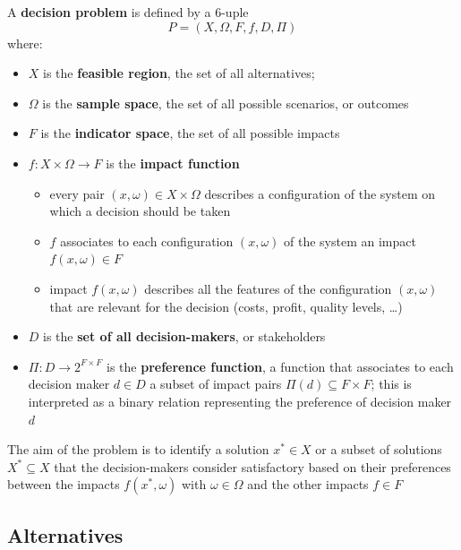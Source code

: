 \begin{definition}
	A \textbf{decision problem} is defined by a 6-uple
	$$ P = \left(X, \Omega, F, f, D, \Pi \right)$$
	where: 
	\begin{itemize}
		\item $X$ is the \textbf{feasible region}, the set of all alternatives; 
		
		\item $\Omega$ is the \textbf{sample space}, the set of all possible scenarios, or outcomes
		
		\item $F$ is the \textbf{indicator space}, the set of all possible impacts
		
		\item $f: X \times \Omega \rightarrow F$ is the \textbf{impact function}
		\begin{itemize}
			\item every pair $(x, \omega) \in X \times \Omega$ describes a configuration of the system on which a decision should be taken
			
			\item $f$ associates to each configuration $(x, \omega)$ of the system an impact $f(x, \omega) \in F$
			
			\item impact $f(x, \omega)$ describes all the features of the configuration $(x, \omega)$ that are relevant for the decision (costs, profit, quality levels, \dots)
		\end{itemize}
		
		\item $D$ is the \textbf{set of all decision-makers}, or stakeholders
		
		\item $\Pi: D \rightarrow 2^{F \times F}$ is the \textbf{preference function}, a function that associates to each decision maker $d \in D$ a subset of impact pairs $\Pi(d) \subseteq F \times F$; this is interpreted as a binary relation representing the preference of decision maker $d$
	\end{itemize}
\end{definition}

The aim of the problem is to identify a solution $x^\ast \in X$ or a subset of solutions $X^\ast \subseteq X$ that the decision-makers consider satisfactory based on their preferences between the impacts $f(x^\ast, \omega)$ with $\omega \in \Omega$ and the other impacts $f \in F$

\subsection{Alternatives}
\label{subsec:alternativesdef}

